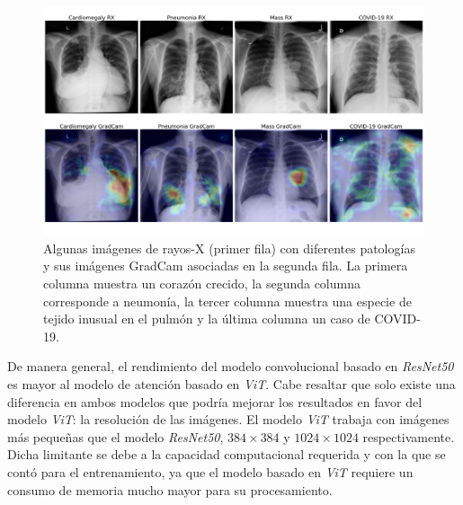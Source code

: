 \begin{figure}[ht!]
    \centering
    \includegraphics[width=0.8 \textwidth]{Chapters/4. ViT-Lung/images/vlgrid.png}
    \caption{Algunas imágenes de rayos-X (primer fila) con diferentes patologías y sus imágenes GradCam
             asociadas en la segunda fila. La primera columna muestra un corazón crecido, la segunda
             columna corresponde a neumonía, la tercer columna muestra una especie de tejido inusual
             en el pulmón y la última columna un caso de COVID-19.}
    \label{img-results}
\end{figure}

De manera general, el rendimiento del modelo convolucional basado en \textit{ResNet50} es mayor al
modelo de atención basado en \textit{ViT}. Cabe resaltar que solo existe una diferencia en ambos modelos
que podría mejorar los resultados en favor del modelo \textit{ViT}: la resolución de las imágenes. El
modelo \textit{ViT} trabaja con imágenes más pequeñas que el modelo \textit{ResNet50}, $384\times384$ y
$1024\times1024$ respectivamente. Dicha limitante se debe a la capacidad computacional requerida y con la
que se contó para el entrenamiento, ya que el modelo basado en \textit{ViT} requiere un consumo de memoria
mucho mayor para su procesamiento.


